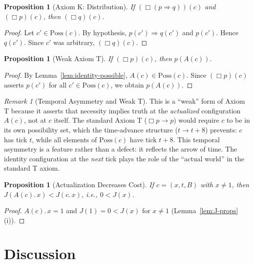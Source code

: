 \documentclass[12pt,a4paper]{article}
\newtheorem{proposition}[theorem]{Proposition}
\theoremstyle{definition}
\theoremstyle{remark}
\newtheorem{remark}[theorem]{Remark}
\begin{document}
\begin{proposition}[Axiom K: Distribution]
\label{prop:K}
If\/ $(\Box(p \Rightarrow q))(c)$ and $(\Box p)(c)$, then
$(\Box q)(c)$.
\end{proposition}

\begin{proof}
Let $c' \in \mathrm{Poss}(c)$.  By hypothesis,
$p(c') \Rightarrow q(c')$ and $p(c')$.  Hence $q(c')$.  Since $c'$
was arbitrary, $(\Box q)(c)$.
\end{proof}

\begin{proposition}[Weak Axiom T]
\label{prop:T-weak}
If $(\Box p)(c)$, then $p(A(c))$.
\end{proposition}

\begin{proof}
By Lemma~\ref{lem:identity-possible}, $A(c) \in \mathrm{Poss}(c)$.
Since $(\Box p)(c)$ asserts $p(c')$ for all $c' \in \mathrm{Poss}(c)$,
we obtain $p(A(c))$.
\end{proof}

\begin{remark}[Temporal Asymmetry and Weak T]
This is a ``weak'' form of Axiom T because it asserts that necessity
implies truth at the \emph{actualized} configuration $A(c)$, not at
$c$ itself.  The standard Axiom T ($\Box p \to p$) would require $c$ to
be in its own possibility set, which the time-advance structure
($t \to t{+}8$) prevents: $c$ has tick $t$, while all elements of
$\mathrm{Poss}(c)$ have tick $t{+}8$.  This temporal asymmetry is a
feature rather than a defect: it reflects the arrow of time.  The
identity configuration at the \emph{next} tick plays the role of the
``actual world'' in the standard T axiom.
\end{remark}

\begin{proposition}[Actualization Decreases Cost]
\label{prop:cost-decrease}
If $c = (x, t, B)$ with $x \neq 1$, then
$J(A(c).\,x) < J(c.\,x)$, i.e., $0 < J(x)$.
\end{proposition}

\begin{proof}
$A(c).\,x = 1$ and $J(1) = 0 < J(x)$ for $x \neq 1$
(Lemma~\ref{lem:J-props}(i)).
\end{proof}

\section{Discussion}
\label{sec:discuss}
\end{document}
